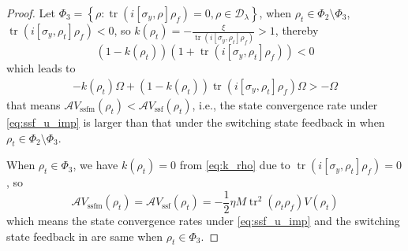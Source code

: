 \documentclass[]{elsarticle}
\begin{document}
\begin{proof}
	Let $\Phi_3=\left\{\rho:\operatorname{tr}\left(i\left[\sigma_{y}, \rho\right] {\rho_f}\right)=0, \rho\in \mathcal{D}_\lambda\right\}$,
	when $\rho_t\in\Phi_2\setminus\Phi_3$, $\operatorname{tr}\left(i\left[\sigma_{y}, \rho_{t}\right] \rho_f\right)<0$, so $k\left(\rho_{t}\right)=-\frac{\xi}{\operatorname{tr}\left(i\left[\sigma_{y}, \rho_{t}\right] \rho_f\right)}>1$, thereby
	\begin{equation}\label{eq:ass2}
		\left(1-k\left(\rho_{t}\right)\right)\left(1+\operatorname{tr}\left(i\left[\sigma_{y}, \rho_{t}\right] {\rho_f}\right)\right)<0
	\end{equation}
	which leads to
	\begin{equation}\label{eq:ass2_1}
		\begin{aligned}
			-k\left(\rho_{t}\right)\Omega +\left(1-k\left(\rho_{t}\right)\right)\operatorname{tr}\left(i\left[\sigma_{y}, \rho_{t}\right] {\rho_f}\right)\Omega>-\Omega
		\end{aligned}
	\end{equation}
	that means $\mathcal{A} V_{\mathrm{ssfm}}\left(\rho_{t}\right)<\mathcal{A} V_{\mathrm{ssf}}\left(\rho_{t}\right)$, i.e., the state convergence rate under \eqref{eq:ssf_u_imp} is larger than that under the switching state feedback in \cite{WSJZJ2021b} when $\rho_{t}\in\Phi_2\setminus\Phi_3$.
	
	When $\rho_t\in\Phi_3$, we have $k\left(\rho_{t}\right)=0$ from \eqref{eq:k_rho} due to $\operatorname{tr}\left(i\left[\sigma_{y}, \rho_{t}\right] \rho_f\right)=0$, so 
	\begin{equation}
		\mathcal{A} V_{\mathrm{ssfm}}\left(\rho_{t}\right)=\mathcal{A} V_{\mathrm{ssf}}\left(\rho_{t}\right)=-\frac{1}{2}{\eta M}\operatorname{tr}^{2}\left(\rho_{t} {\rho_f}\right)V\left(\rho_{t}\right)
	\end{equation}
	which means the state convergence rates under \eqref{eq:ssf_u_imp} and the switching state feedback in \cite{WSJZJ2021b} are same when $\rho_{t}\in\Phi_3$.
	

\end{proof}
\end{document}
